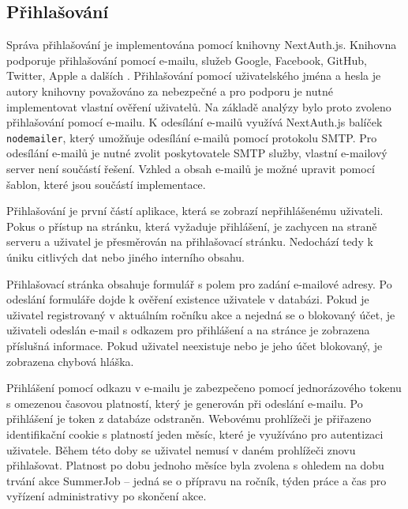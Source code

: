 \subsection{Přihlašování}

Správa přihlašování je implementována pomocí knihovny NextAuth.js. Knihovna podporuje
přihlašování pomocí e-mailu, služeb Google, Facebook, GitHub, Twitter, Apple a dalších \cite{nextauth}. Přihlašování pomocí uživatelského jména a hesla je autory knihovny 
považováno za nebezpečné a pro podporu je nutné implementovat vlastní ověření uživatelů. Na základě analýzy bylo proto zvoleno přihlašování pomocí e-mailu.
K odesílání e-mailů využívá NextAuth.js balíček \texttt{nodemailer}, který umožňuje odesílání e-mailů pomocí protokolu SMTP. Pro odesílání e-mailů je nutné
zvolit poskytovatele SMTP služby, vlastní e-mailový server není součástí řešení. Vzhled a obsah e-mailů je možné upravit pomocí šablon, které jsou součástí
implementace.

Přihlašování je první částí aplikace, která se zobrazí nepřihlášenému uživateli. Pokus o přístup na stránku, která vyžaduje přihlášení,
je zachycen na straně serveru a uživatel je přesměrován na přihlašovací stránku. Nedochází tedy k úniku citlivých dat nebo jiného interního obsahu.

Přihlašovací stránka obsahuje formulář s polem pro zadání e-mailové adresy. Po odeslání formuláře dojde k ověření existence uživatele v databázi.
Pokud je uživatel registrovaný v aktuálním ročníku akce a nejedná se o blokovaný účet, je uživateli odeslán e-mail s odkazem pro přihlášení a na stránce je 
zobrazena příslušná informace. Pokud uživatel neexistuje nebo je jeho účet blokovaný, je zobrazena chybová hláška.

Přihlášení pomocí odkazu v e-mailu je zabezpečeno pomocí jednorázového tokenu s omezenou časovou platností, který je generován při odeslání e-mailu.
Po přihlášení je token z databáze odstraněn.
Webovému prohlížeči je přiřazeno identifikační cookie s platností jeden měsíc, které je využíváno pro autentizaci uživatele. Během této doby se uživatel nemusí v
daném prohlížeči znovu přihlašovat. Platnost po dobu jednoho měsíce byla zvolena s ohledem na dobu trvání akce SummerJob -- jedná se o přípravu na ročník,
týden práce a čas pro vyřízení administrativy po skončení akce.

